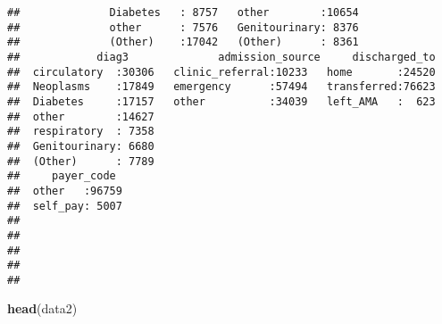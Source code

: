 \documentclass[]{article}
\newenvironment{Shaded}{\begin{snugshade}}{\end{snugshade}}
\newcommand{\KeywordTok}[1]{\textcolor[rgb]{0.13,0.29,0.53}{\textbf{#1}}}
\newcommand{\NormalTok}[1]{#1}
\begin{document}
\begin{verbatim}
##              Diabetes   : 8757   other        :10654  
##              other      : 7576   Genitourinary: 8376  
##              (Other)    :17042   (Other)      : 8361  
##            diag3              admission_source     discharged_to  
##  circulatory  :30306   clinic_referral:10233   home       :24520  
##  Neoplasms    :17849   emergency      :57494   transferred:76623  
##  Diabetes     :17157   other          :34039   left_AMA   :  623  
##  other        :14627                                              
##  respiratory  : 7358                                              
##  Genitourinary: 6680                                              
##  (Other)      : 7789                                              
##     payer_code   
##  other   :96759  
##  self_pay: 5007  
##                  
##                  
##                  
##                  
## 
\end{verbatim}

\begin{Shaded}
\begin{Highlighting}[]
\KeywordTok{head}\NormalTok{(data2)}
\end{Highlighting}
\end{Shaded}
\end{document}
